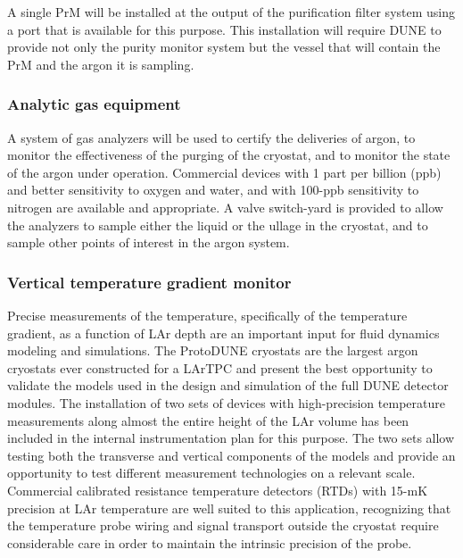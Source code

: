 A single PrM will be installed at the output of the purification filter system using a port that is available for this purpose. This installation will require DUNE to provide not only the purity monitor system but the vessel that will contain the PrM and the argon it is sampling.


\subsubsection{Analytic gas equipment}

A system of gas analyzers will be used to certify the deliveries of argon, to monitor the effectiveness of the purging of the cryostat, and to monitor the state of the argon under operation. Commercial devices with 1 part per billion (ppb) and better sensitivity to oxygen and water, and with 100-ppb sensitivity to nitrogen are available and appropriate. A valve switch-yard is provided to allow the analyzers to sample either the liquid or the ullage in the cryostat, and to sample other points of interest in the argon system.


\subsubsection{Vertical temperature gradient monitor}

	Precise %
	measurements of the temperature, specifically of the temperature gradient, %
	as a function of LAr depth are %
	an important input for fluid dynamics modeling and simulations.  The ProtoDUNE cryostats are the largest argon cryostats ever constructed for a LArTPC and present the best opportunity to validate the models used in the design and simulation of the full DUNE detector modules. The installation of two sets of devices with high-precision temperature measurements
	along almost the entire height of the LAr volume %
	has been included in the internal instrumentation plan for this purpose. The two sets allow testing both the transverse and vertical components of the models and provide an opportunity to test different measurement technologies on a relevant scale. 
	Commercial calibrated resistance temperature detectors (RTDs) with 15-mK precision at LAr temperature are well suited to this application, recognizing that the temperature probe wiring and signal transport outside the cryostat require considerable care in order to maintain %
	the intrinsic precision of the probe.
	

